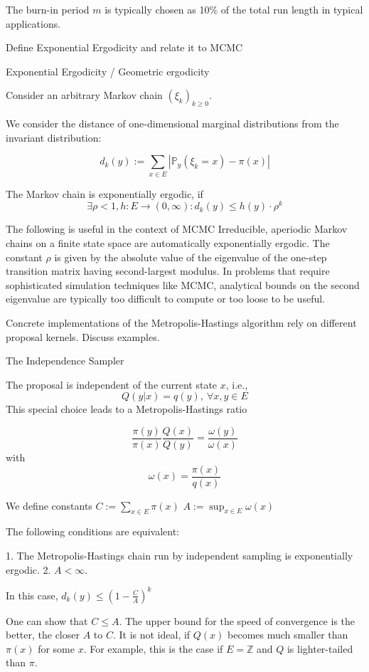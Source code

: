 The burn-in period \(m\) is typically chosen as 10\% of the total run length in typical applications.


Define Exponential Ergodicity and relate it to MCMC

Exponential Ergodicity / Geometric ergodicity

Consider an arbitrary Markov chain \((\xi_{k})_{k \geq 0}\).

We consider the distance of one-dimensional marginal distributions from the invariant distribution:

\[ d_{k}(y) := \sum_{x \in E} |\mathbb{P}_{y}(\xi_{k} = x) - \pi(x)| \]

The Markov chain is exponentially ergodic, if 
\[ \exists \rho < 1, h: E \rightarrow (0, \infty): d_{k}(y) \leq h(y) \cdot \rho^{k} \]

The following is useful in the context of MCMC
Irreducible, aperiodic Markov chains on a finite state space are automatically exponentially ergodic.
The constant \(\rho\) is given by the absolute value of the eigenvalue of the one-step transition matrix having second-largest modulus.
In problems that require sophisticated simulation techniques like MCMC, analytical bounds on the second eigenvalue are typically too difficult to compute or too loose to be useful. 

Concrete implementations of the Metropolis-Hastings algorithm rely on different
proposal kernels. Discuss examples.

The Independence Sampler

The proposal is independent of the current state \(x\), i.e., 
\[ Q(y|x) = q(y),\ \forall x, y \in E \]
This special choice leads to a Metropolis-Hastings ratio

\[ \frac{\pi(y)}{\pi(x)} \frac{Q(x)}{Q(y)} = \frac{\omega(y)}{\omega(x)}\] 
with 
\[ \omega(x) = \frac{\pi(x)}{q(x)} \]


We define constants
\( C := \sum_{x \in E} \pi(x)\)
\(A := \sup_{x \in E} \omega(x) \)

The following conditions are equivalent:

1. The Metropolis-Hastings chain run by independent sampling is exponentially ergodic.
2. \( A < \infty \).

In this case,
\( d_k(y) \leq \left( 1 - \frac{C}{A} \right)^k \)

One can show that \( C \leq A \). The upper bound for the speed of convergence is the better, the closer \(A\) to \(C\).
It is not ideal, if \(Q(x)\) becomes much smaller than \(\pi(x)\) for some \(x\). For example, this is the case 
if \(E = \mathbb{Z}\) and \(Q\) is lighter-tailed than \(\pi\). 



